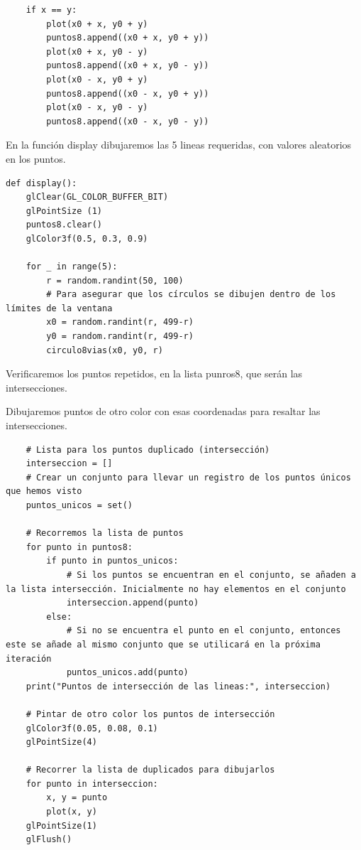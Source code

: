 \documentclass[a4paper]{article}
\begin{document}
\begin{center}
\begin{mycodeboxl}
\begin{lstlisting}
    if x == y: 
        plot(x0 + x, y0 + y)
        puntos8.append((x0 + x, y0 + y))
        plot(x0 + x, y0 - y)
        puntos8.append((x0 + x, y0 - y))
        plot(x0 - x, y0 + y)
        puntos8.append((x0 - x, y0 + y))
        plot(x0 - x, y0 - y)
        puntos8.append((x0 - x, y0 - y))
\end{lstlisting}
\end{mycodeboxl}
\end{center}

En la función display dibujaremos las 5 lineas requeridas, con valores aleatorios en los puntos.
\begin{center}
\begin{mycodebox}
\begin{lstlisting}
def display():
    glClear(GL_COLOR_BUFFER_BIT)
    glPointSize (1)
    puntos8.clear()
    glColor3f(0.5, 0.3, 0.9) 

    for _ in range(5):
        r = random.randint(50, 100)
        # Para asegurar que los círculos se dibujen dentro de los límites de la ventana 
        x0 = random.randint(r, 499-r)
        y0 = random.randint(r, 499-r)
        circulo8vias(x0, y0, r)
\end{lstlisting}
\end{mycodebox}
\end{center}
\newpage
Verificaremos los puntos repetidos, en la lista punros8, que serán las intersecciones. 

Dibujaremos puntos de otro color con esas coordenadas para resaltar las intersecciones.
\begin{center}
    
\begin{mycodeboxl}
\begin{lstlisting}
    # Lista para los puntos duplicado (intersección) 
    interseccion = []
    # Crear un conjunto para llevar un registro de los puntos únicos que hemos visto
    puntos_unicos = set()

    # Recorremos la lista de puntos
    for punto in puntos8:
        if punto in puntos_unicos:
            # Si los puntos se encuentran en el conjunto, se añaden a la lista intersección. Inicialmente no hay elementos en el conjunto 
            interseccion.append(punto)
        else:
            # Si no se encuentra el punto en el conjunto, entonces este se añade al mismo conjunto que se utilicará en la próxima iteración
            puntos_unicos.add(punto)
    print("Puntos de intersección de las lineas:", interseccion)

    # Pintar de otro color los puntos de intersección
    glColor3f(0.05, 0.08, 0.1) 
    glPointSize(4)

    # Recorrer la lista de duplicados para dibujarlos 
    for punto in interseccion:
        x, y = punto
        plot(x, y)
    glPointSize(1)
    glFlush()
\end{lstlisting}
\end{mycodeboxl}
\end{center}
\end{document}
